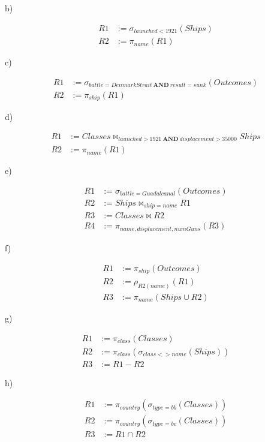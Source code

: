 \documentclass[../../main.tex]{subfiles}
\begin{document}
b)

\begin{align*}
  R1 &:= \sigma_{launched < 1921}(Ships) \\
  R2 &:= \pi_{name}(R1)
\end{align*}

c)

\begin{align*}
  R1 &:= \sigma_{battle=DenmarkStrait \ \mathbf{AND} \ result=sunk}
         (Outcomes) \\
  R2 &:= \pi_{ship}(R1)
\end{align*}

d)

\begin{align*}
  R1 &:= Classes \bowtie_{launched > 1921 \ \mathbf{AND} \
         displacement > 35000} Ships \\
  R2 &:= \pi_{name}(R1)
\end{align*}

e)

\begin{align*}
  R1 &:= \sigma_{battle = Guadalcanal}(Outcomes) \\
  R2 &:= Ships \bowtie_{ship = name} R1 \\
  R3 &:= Classes \bowtie R2 \\
  R4 &:= \pi_{name, displacement, numGuns}(R3)
\end{align*}

f)

\begin{align*}
  R1 &:= \pi_{ship}(Outcomes) \\
  R2 &:= \rho_{R2(name)}(R1) \\
  R3 &:= \pi_{name}(Ships \cup R2)
\end{align*}

g)

\begin{align*}
  R1 &:= \pi_{class}(Classes) \\
  R2 &:= \pi_{class}(\sigma_{class <> name}(Ships)) \\
  R3 &:= R1 - R2
\end{align*}

h)

\begin{align*}
  R1 &:= \pi_{country}(\sigma_{type=bb}(Classes)) \\
  R2 &:= \pi_{country}(\sigma_{type=bc}(Classes)) \\
  R3 &:= R1 \cap R2
\end{align*}
\end{document}
